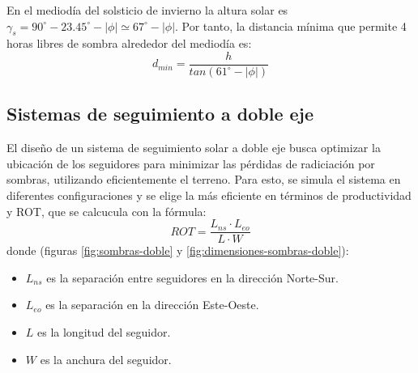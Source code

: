 En el mediodía del solsticio de invierno la altura solar es \(\gamma_s = 90^\circ - 23.45^\circ - |\phi| \simeq 67^\circ - |\phi|\). Por tanto, la distancia mínima que permite 4 horas libres de sombra alrededor del mediodía es:
\begin{equation}
d_{min}=\frac{h}{tan(61^\circ - |\phi|)}
\end{equation}

\subsection{Sistemas de seguimiento a doble eje}
\label{sec:orgdaa9cc7}
El diseño de un sistema de seguimiento solar a doble eje busca optimizar la ubicación de los seguidores para minimizar las pérdidas de radiciación por sombras, utilizando eficientemente el terreno. Para esto, se simula el sistema en diferentes configuraciones y se elige la más eficiente en términos de productividad y ROT, que se calcucula con la fórmula:
\begin{equation}
ROT = \frac{L_{ns}\cdot L_{eo}}{L\cdot W}
\end{equation}
donde (figuras \ref{fig:sombras-doble} y \ref{fig:dimensiones-sombras-doble}):
\begin{itemize}
\item \(L_{ns}\) es la separación entre seguidores en la dirección Norte-Sur.
\item \(L_{eo}\) es la separación en la dirección Este-Oeste.
\item \(L\) es la longitud del seguidor.
\item \(W\) es la anchura del seguidor.
\end{itemize}

